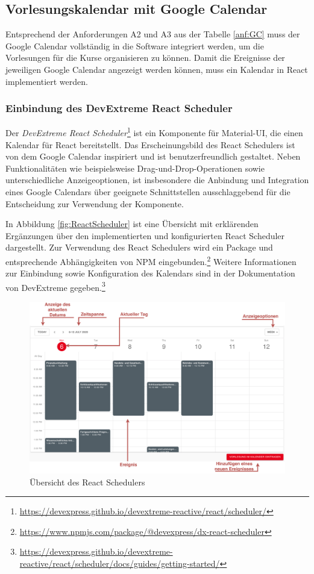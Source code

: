 \subsection{Vorlesungskalendar mit Google Calendar}\label{ch:GC}
Entsprechend der Anforderungen A2 und A3 aus der Tabelle \vref{anf:GC} muss der Google Calendar vollständig in die Software integriert werden, um die Vorlesungen für die Kurse organisieren zu können. 
Damit die Ereignisse der jeweiligen Google Calendar angezeigt werden können, muss ein Kalendar in React implementiert werden. 

\subsubsection{Einbindung des DevExtreme React Scheduler}
Der \textit{DevExtreme React Scheduler}\footnote{\url{https://devexpress.github.io/devextreme-reactive/react/scheduler/}} ist ein Komponente für Material-UI, die einen Kalendar für React bereitstellt. 
Das Erscheinungsbild des React Schedulers ist von dem Google Calendar inspiriert und ist benutzerfreundlich gestaltet.\autocite[Vgl.][]{ReactScheduler} 
Neben Funktionalitäten wie beispielsweise Drag-und-Drop-Operationen sowie unterschiedliche Anzeigeoptionen, ist insbesondere die Anbindung und Integration eines Google Calendars über geeignete Schnittstellen ausschlaggebend für die Entscheidung zur Verwendung der Komponente. 

In Abbildung \vref{fig:ReactScheduler} ist eine Übersicht mit erklärenden Ergänzungen über den implementierten und konfigurierten React Scheduler dargestellt. 
Zur Verwendung des React Schedulers wird ein Package und entsprechende Abhängigkeiten von NPM eingebunden.\footnote{\url{https://www.npmjs.com/package/@devexpress/dx-react-scheduler}}
Weitere Informationen zur Einbindung sowie Konfiguration des Kalendars sind in der Dokumentation von DevExtreme gegeben.\footnote{\url{https://devexpress.github.io/devextreme-reactive/react/scheduler/docs/guides/getting-started/}}
\begin{figure}[H]
	\centering 
	\includegraphics[width=\textwidth]{img/FrontEnd/ReactCalendar.pdf}
	\caption[Übersicht des React Schedulers]{\label{fig:ReactScheduler}Übersicht des React Schedulers\footnotemark}
\end{figure}

